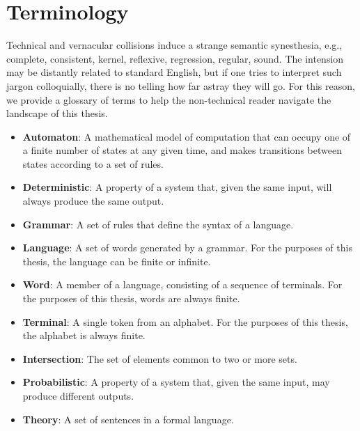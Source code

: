 \chapter*{\rm\bfseries Terminology}
\label{ch:terminology}

Technical and vernacular collisions induce a strange semantic synesthesia, e.g., complete, consistent, kernel, reflexive, regression, regular, sound. The intension may be distantly related to standard English, but if one tries to interpret such jargon colloquially, there is no telling how far astray they will go. For this reason, we provide a glossary of terms to help the non-technical reader navigate the landscape of this thesis.

\begin{itemize}
    \item \textbf{Automaton}: A mathematical model of computation that can occupy one of a finite number of states at any given time, and makes transitions between states according to a set of rules.
    \item \textbf{Deterministic}: A property of a system that, given the same input, will always produce the same output.
    \item \textbf{Grammar}: A set of rules that define the syntax of a language.
    \item \textbf{Language}: A set of words generated by a grammar. For the purposes of this thesis, the language can be finite or infinite.
    \item \textbf{Word}: A member of a language, consisting of a sequence of terminals. For the purposes of this thesis, words are always finite.
    \item \textbf{Terminal}: A single token from an alphabet. For the purposes of this thesis, the alphabet is always finite.
    \item \textbf{Intersection}: The set of elements common to two or more sets.
    \item \textbf{Probabilistic}: A property of a system that, given the same input, may produce different outputs.
    \item \textbf{Theory}: A set of sentences in a formal language.
\end{itemize}